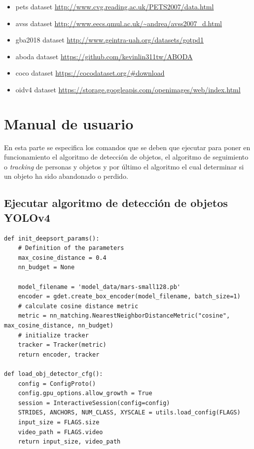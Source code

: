 \begin{itemize}
    \item \gls{pets} dataset \url{http://www.cvg.reading.ac.uk/PETS2007/data.html} \cite{pets2007-dataset}
    \item \gls{avss} dataset \url{http://www.eecs.qmul.ac.uk/~andrea/avss2007_d.html} \cite{AVSSAB2007-dataset}
    \item \gls{gba2018} dataset \url{http://www.geintra-uah.org/datasets/gotpd1} \cite{gba-dataset}
    \item \gls{aboda} dataset \url{https://github.com/kevinlin311tw/ABODA} \cite{aboda-dataset}
    \item \gls{coco} dataset \url{https://cocodataset.org/#download} \cite{lin2015microsoft}
    \item \gls{oidv4} dataset \url{https://storage.googleapis.com/openimages/web/index.html} \cite{Kuznetsova_2020}
    
    
    
    
\end{itemize}

\section{Manual de usuario}
\label{sec:manual-usuario}

En esta parte se especifica los comandos que se deben que ejecutar para poner en funcionamiento el algoritmo de detección de objetos, el algoritmo de seguimiento o \textit{tracking} de personas y objetos y por último el algoritmo el cual determinar si un objeto ha sido abandonado o perdido.

\subsection{Ejecutar algoritmo de detección de objetos YOLOv4}
\label{subsec:ejecutar-deteccion-yolov4}

\vspace{0.5cm}
\begin{lstlisting}[language=iPython,caption=Funciones de object tracking ,captionpos=b,label={lst:object-tracking}]
def init_deepsort_params():
    # Definition of the parameters
    max_cosine_distance = 0.4
    nn_budget = None

    model_filename = 'model_data/mars-small128.pb'
    encoder = gdet.create_box_encoder(model_filename, batch_size=1)
    # calculate cosine distance metric
    metric = nn_matching.NearestNeighborDistanceMetric("cosine", max_cosine_distance, nn_budget)
    # initialize tracker
    tracker = Tracker(metric)
    return encoder, tracker
    
def load_obj_detector_cfg():
    config = ConfigProto()
    config.gpu_options.allow_growth = True
    session = InteractiveSession(config=config)
    STRIDES, ANCHORS, NUM_CLASS, XYSCALE = utils.load_config(FLAGS)
    input_size = FLAGS.size
    video_path = FLAGS.video
    return input_size, video_path

\end{lstlisting}

